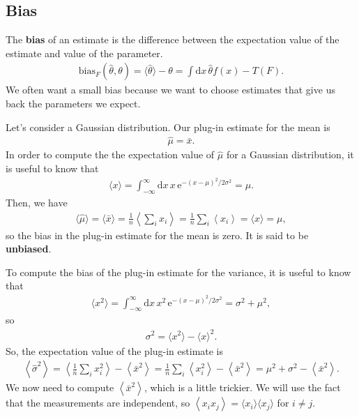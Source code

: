 \subsection{Bias}
The \textbf{bias} of an estimate is the difference between the expectation value of the estimate and value of the parameter.
\begin{align}
    \text{bias}_F(\hat{\theta}, \theta) = \langle \hat{\theta} \rangle - \theta
    = \int\mathrm{d}x\, \hat{\theta}f(x) - T(F).
\end{align}
We often want a small bias because we want to choose estimates that give us back the parameters we expect.

Let's consider a Gaussian distribution. Our plug-in estimate for the mean is
\begin{align}
    \hat{\mu} = \bar{x}.
\end{align}
In order to compute the the expectation value of $\hat{\mu}$ for a Gaussian distribution, it is useful to know that
\begin{align}
    \langle x \rangle
    = \int_{-\infty}^\infty\mathrm{d}x\,x\,\mathrm{e}^{-(x-\mu)^2/2\sigma^2}
    = \mu.
\end{align}
Then, we have
\begin{align}
    \langle \hat{\mu}\rangle = \langle \bar{x}\rangle = \frac{1}{n}\left\langle\sum_i x_i\right\rangle
    = \frac{1}{n}\sum_i \left\langle x_i\right\rangle
    = \langle x\rangle
    = \mu,
\end{align}
so the bias in the plug-in estimate for the mean is zero. It is said to be \textbf{unbiased}.

To compute the bias of the plug-in estimate for the variance, it is useful to know that
\begin{align}
    \langle x^2 \rangle
    = \int_{-\infty}^\infty\mathrm{d}x\,x^2\,\mathrm{e}^{-(x-\mu)^2/2\sigma^2}
    = \sigma^2 + \mu^2,
\end{align}
so
\begin{align}
    \sigma^2 = \langle x^2 \rangle - \langle x\rangle^2.
\end{align}
So, the expectation value of the plug-in estimate is
\begin{align}
\left\langle \hat{\sigma}^2 \right\rangle = \left\langle\frac{1}{n}\sum_i x_i^2\right\rangle - \left\langle\bar{x}^2\right\rangle
= \frac{1}{n}\sum_i \left\langle x_i^2\right\rangle  - \left\langle\bar{x}^2\right\rangle
= \mu^2 + \sigma^2 - \left\langle\bar{x}^2\right\rangle.
\end{align}
We now need to compute $\left\langle\bar{x}^2\right\rangle$, which is a little trickier.  We will use the fact that the measurements are independent, so $\left\langle x_i x_j\right\rangle = \langle x_i \rangle \langle x_j\rangle$ for $i\ne j$.


